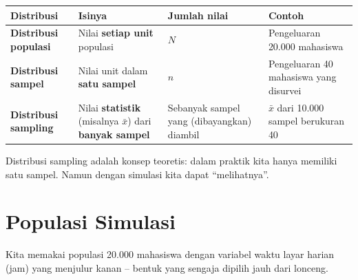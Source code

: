 \documentclass[
  indonesian,
  letterpaper,
]{book}
\newcounter{none} %
\begin{document}
{\def\LTcaptype{none} %
\begin{longtable}[]{@{}
  >{\raggedright\arraybackslash}p{}
  >{\raggedright\arraybackslash}p{}
  >{\raggedright\arraybackslash}p{}
  >{\raggedright\arraybackslash}p{}@{}}
\toprule\noalign{}
\begin{minipage}[b]{\linewidth}\raggedright
Distribusi
\end{minipage} & \begin{minipage}[b]{\linewidth}\raggedright
Isinya
\end{minipage} & \begin{minipage}[b]{\linewidth}\raggedright
Jumlah nilai
\end{minipage} & \begin{minipage}[b]{\linewidth}\raggedright
Contoh
\end{minipage} \\
\midrule\noalign{}
\endhead
\bottomrule\noalign{}
\endlastfoot
\textbf{Distribusi populasi} & Nilai \textbf{setiap unit} populasi &
\(N\) & Pengeluaran 20.000 mahasiswa \\
\textbf{Distribusi sampel} & Nilai unit dalam \textbf{satu sampel} &
\(n\) & Pengeluaran 40 mahasiswa yang disurvei \\
\textbf{Distribusi sampling} & Nilai \textbf{statistik} (misalnya
\(\bar{x}\)) dari \textbf{banyak sampel} & Sebanyak sampel yang
(dibayangkan) diambil & \(\bar{x}\) dari 10.000 sampel berukuran 40 \\
\end{longtable}
}

Distribusi sampling adalah konsep teoretis: dalam praktik kita hanya
memiliki satu sampel. Namun dengan simulasi kita dapat ``melihatnya''.

\section{Populasi Simulasi}\label{populasi-simulasi}

Kita memakai populasi 20.000 mahasiswa dengan variabel waktu layar
harian (jam) yang menjulur kanan -- bentuk yang sengaja dipilih jauh
dari lonceng.
\end{document}
